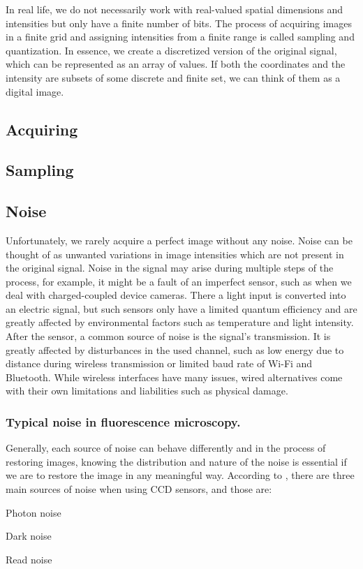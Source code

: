 \documentclass[
  digital,     %
  oneside,     %
  nosansbold,  %
  nocolorbold, %
  lof,         %
  lot,         %
]{fithesis4}
\begin{document}
In real life, we do not necessarily work with real-valued spatial dimensions and
intensities but only have a finite number of bits. The process of
acquiring images in a finite grid and assigning intensities from a finite
range is called sampling and quantization. In essence, we create a discretized
version of the original signal, which can be represented as an array of values.
If both the coordinates and the intensity are subsets of some discrete and finite set,
we can think of them as a digital image.

\subsection{Acquiring}

\subsection{Sampling}

\subsection{Noise}

Unfortunately, we rarely acquire a perfect image without any noise. Noise
can be thought of as unwanted variations in image intensities which are not
present in the original signal. Noise in the signal may arise during multiple
steps of the process, for example, it might be a fault of an imperfect sensor,
such as when we deal with charged-coupled device cameras. There a light input is
converted into an electric signal, but such sensors only have a limited quantum
efficiency and are greatly affected by environmental factors such as 
temperature and light intensity. After the sensor, a common source of noise is
the signal's transmission. It is greatly affected by disturbances in the used
channel, such as low energy due to distance during wireless transmission or
limited baud rate of Wi-Fi and Bluetooth. While wireless interfaces have many
issues, wired alternatives come with their own limitations and liabilities such as physical damage.

\subsubsection{Typical noise in fluorescence microscopy.}

Generally, each source of noise can behave differently and in the process of restoring
images, knowing the distribution and nature of the noise is essential if we are to restore the 
image in any meaningful way. According to \parencite{hamamatsu_ccd}, there are three main sources of noise when using CCD sensors, and those are:
\begin{compactenum}
\item Photon noise
\item Dark noise
\item Read noise
\end{compactenum}
\end{document}
